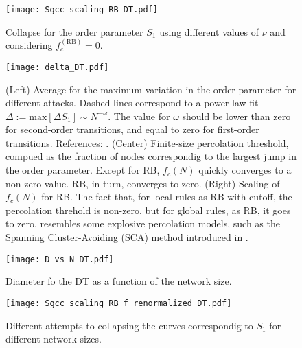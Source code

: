 \documentclass{article}
\begin{document}
\begin{figure}
\centering
\texttt{[image: Sgcc\_scaling\_RB\_DT.pdf]}
\caption{Collapse for the order parameter $S_1$ using different values of $\nu$ and considering $f_c^{\mathrm{(RB)}} = 0$.}
\end{figure}

\begin{figure}
\centering
\texttt{[image: delta\_DT.pdf]}
\caption{(Left) Average for the maximum variation in the order parameter for different attacks. Dashed lines correspond to a power-law fit $\Delta := \mathrm{max}[\Delta S_1] \sim N^{-\omega}$. The value for $\omega$ should be lower than zero for second-order transitions, and equal to zero for first-order transitions. References: \cite{Trevelyan2018DegreeInformation,Bastas2014a,Nagler2011a,Fan2020}. (Center) Finite-size percolation threshold, compued as the fraction of nodes correspondig to the largest jump in the order parameter. Except for RB, $f_c(N)$ quickly converges to a non-zero value. RB, in turn, converges to zero. (Right) Scaling of $f_c(N)$ for RB. The fact that, for local rules as RB with cutoff, the percolation threhold is non-zero, but for global rules, as RB, it goes to zero, resembles some explosive percolation models, such as the Spanning Cluster-Avoiding (SCA) method introduced in \cite{Cho2013}. }
\end{figure}

\begin{figure}
\centering
\texttt{[image: D\_vs\_N\_DT.pdf]}
\caption{Diameter fo the DT as a function of the network size.}
\end{figure}

\begin{figure}
\centering
\texttt{[image: Sgcc\_scaling\_RB\_f\_renormalized\_DT.pdf]}
\caption{Different attempts to collapsing the curves correspondig to $S_1$ for different network sizes.}
\end{figure}



\end{document}
